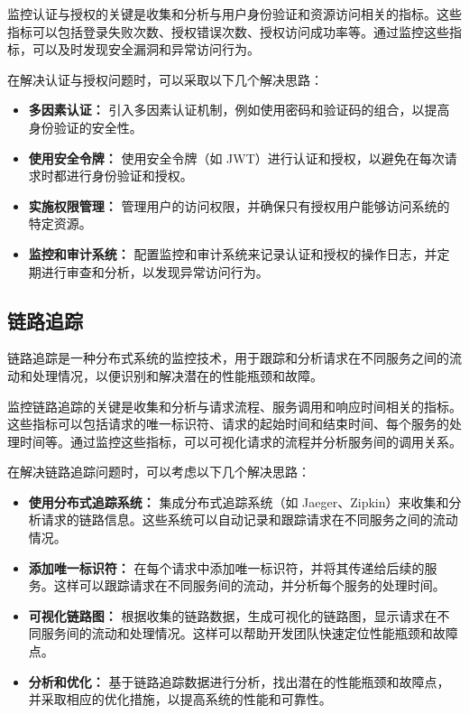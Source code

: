 监控认证与授权的关键是收集和分析与用户身份验证和资源访问相关的指标。这些指标可以包括登录失败次数、授权错误次数、授权访问成功率等。通过监控这些指标，可以及时发现安全漏洞和异常访问行为。

在解决认证与授权问题时，可以采取以下几个解决思路：
\begin{itemize}
	\item \textbf{多因素认证： }引入多因素认证机制，例如使用密码和验证码的组合，以提高身份验证的安全性。
	
	\item \textbf{使用安全令牌： }使用安全令牌（如 JWT）进行认证和授权，以避免在每次请求时都进行身份验证和授权。
	
	\item \textbf{实施权限管理： }管理用户的访问权限，并确保只有授权用户能够访问系统的特定资源。
	
	\item \textbf{监控和审计系统： }配置监控和审计系统来记录认证和授权的操作日志，并定期进行审查和分析，以发现异常访问行为。
\end{itemize}
\subsection{链路追踪}
链路追踪是一种分布式系统的监控技术，用于跟踪和分析请求在不同服务之间的流动和处理情况，以便识别和解决潜在的性能瓶颈和故障。

监控链路追踪的关键是收集和分析与请求流程、服务调用和响应时间相关的指标。这些指标可以包括请求的唯一标识符、请求的起始时间和结束时间、每个服务的处理时间等。通过监控这些指标，可以可视化请求的流程并分析服务间的调用关系。

在解决链路追踪问题时，可以考虑以下几个解决思路：
\begin{itemize}
	\item \textbf{使用分布式追踪系统： }集成分布式追踪系统（如 Jaeger、Zipkin）来收集和分析请求的链路信息。这些系统可以自动记录和跟踪请求在不同服务之间的流动情况。
	
	\item \textbf{添加唯一标识符：} 在每个请求中添加唯一标识符，并将其传递给后续的服务。这样可以跟踪请求在不同服务间的流动，并分析每个服务的处理时间。
	
	\item \textbf{可视化链路图： }根据收集的链路数据，生成可视化的链路图，显示请求在不同服务间的流动和处理情况。这样可以帮助开发团队快速定位性能瓶颈和故障点。
	
	\item \textbf{分析和优化： }基于链路追踪数据进行分析，找出潜在的性能瓶颈和故障点，并采取相应的优化措施，以提高系统的性能和可靠性。
\end{itemize}
